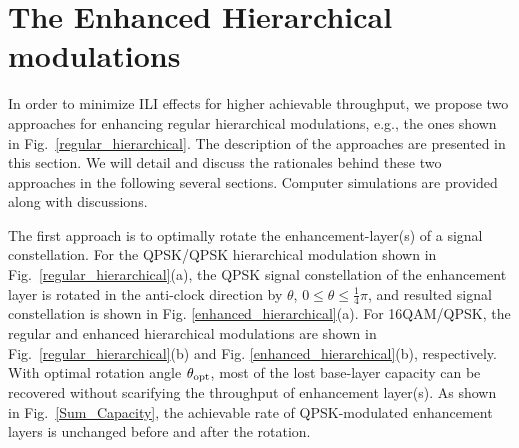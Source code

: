 \documentclass[10pt,fleqn, twocolumn]{IEEEtran}
\begin{document}
\section{The Enhanced Hierarchical modulations}
In order to minimize ILI effects for higher achievable throughput,
we propose two approaches for enhancing regular hierarchical
modulations, e.g., the ones shown in
Fig.~\ref{regular_hierarchical}. The description of the approaches
are presented in this section.  We will detail and discuss the
rationales behind these two approaches in the following several
sections. Computer simulations are provided along with
discussions.

The first approach is to optimally rotate the enhancement-layer(s)
of a signal constellation. For the QPSK/QPSK hierarchical
modulation shown in Fig.~\ref{regular_hierarchical}(a), the QPSK
signal constellation of the enhancement layer is rotated in the
anti-clock direction by $\theta$, $0\leq\theta\leq\frac{1}{4}\pi$,
and resulted signal constellation is shown in Fig.
\ref{enhanced_hierarchical}(a). For 16QAM/QPSK, the regular and
enhanced hierarchical modulations are shown in
Fig.~\ref{regular_hierarchical}(b) and Fig.
\ref{enhanced_hierarchical}(b), respectively.  With optimal
rotation angle $\theta_{\rm opt}$, most of the lost base-layer
capacity can be recovered without scarifying the throughput of
enhancement layer(s). As shown in Fig.~\ref{Sum_Capacity}, the
achievable rate of QPSK-modulated enhancement layers is unchanged
before and after the rotation.
\begin{figure}
\end{figure}
\end{document}
